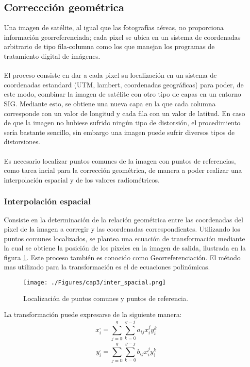 \subsection{Correccci\'on geom\'etrica}\label{sec:corrGeometrica}
Una imagen de sat\'elite, al igual que las fotograf\'ias a\'ereas, no proporciona informaci\'on georreferenciada; cada pixel se ubica en un sistema de coordenadas arbitrario de tipo fila-columna como los que manejan los programas de tratamiento digital de im\'agenes.\\~\\
El proceso consiste en dar a cada pixel su localizaci\'on en un sistema de coordenadas estandard (UTM, lambert, coordenadas geogr\'aficas) para poder, de este modo, combinar la imagen de sat\'elite con otro tipo de capas en un entorno SIG. Mediante esto, se obtiene una nueva capa en la que cada columna corresponde con un valor de longitud y cada fila con un valor de latitud. En caso de que la imagen no hubiese sufrido ningún tipo de distorsi\'on, el procedimiento ser\'ia bastante sencillo, sin embargo una imagen puede sufrir diversos tipos de distorsiones.\\~\\
Es necesario localizar puntos comunes de la imagen con puntos de referencias, como tarea incial para la correcci\'on geom\'etrica, de manera a poder realizar una interpolaci\'on espacial y de los valores radiom\'etricos\cite{deniseCultivos}.

\subsubsection{Interpolaci\'on espacial}
Consiste en la determinaci\'on de la relaci\'on geom\'etrica entre las coordenadas del pixel de la imagen a corregir y las coordenadas correspondientes. Utilizando los puntos comunes localizados, se plantea una ecuaci\'on de transformaci\'on mediante la cual se obtiene la posici\'on de los pixeles en la imagen de salida, ilustrada en la figura \ref{fig:intEspacial}. Este proceso tambi\'en es conocido como Georreferenciaci\'on. El m\'etodo mas utilizado para la transformaci\'on es el de ecuaciones polin\'omicas. 
    \begin{figure}[H]
    	\centering
    	\texttt{[image: ./Figures/cap3/inter\_spacial.png]}
    	\caption{Localizaci\'on de puntos comunes y puntos de referencia.}
    	\label{fig:intEspacial}
    \end{figure}
 
 La transformaci\'on puede expresarse de la siguiente manera:
	\begin{equation}
	x^{,}_{i} = \sum_{j=0}^{g} \sum_{k=0}^{g-j} a_{ij}x^{j}_{i}y^{k}_{i}
	\end{equation} 
		\begin{equation}
		y^{,}_{i} = \sum_{j=0}^{g} \sum_{k=0}^{g-j} b_{ij}x^{j}_{i}y^{k}_{i}
		\end{equation} 

